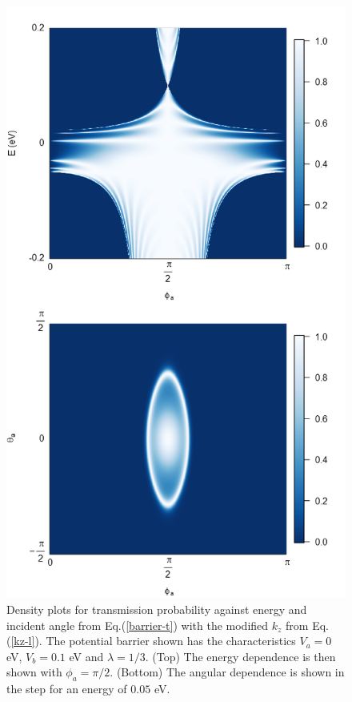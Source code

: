 \documentclass[prb,twocolumn,aps,superscriptaddress,showpacs,floatfix]{revtex4}
\begin{document}
\begin{figure}
	\centerline{\includegraphics[scale=0.4]{barrier-l3}}
	\caption{Density plots for transmission probability against energy and incident angle from Eq.(\ref{barrier-t}) with the modified $k_{z}$ from Eq.(\ref{kz-l}). The potential barrier shown has the characteristics $V_{a}=0$ eV, $V_{b}=0.1$ eV and $\lambda = 1/3$. (Top) The energy dependence is then shown with $\phi_{a}=\pi/2$. (Bottom) The angular dependence is shown in the step for an energy of $0.05$ eV.}
	\label{barrier-l3}
\end{figure}
\end{document}
